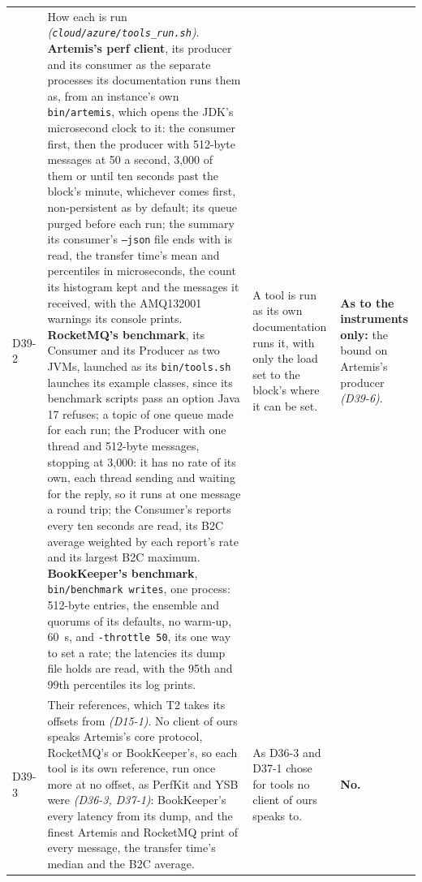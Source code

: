 \documentclass[11pt]{article}
\newcommand{\gl}[1]{{\color{soft}\itshape\small (#1)}}
\begin{document}
{\begin{longtable}{@{}p{1.1cm} >{\raggedright\arraybackslash}p{6.1cm} >{\raggedright\arraybackslash}p{6.0cm} >{\raggedright\arraybackslash}p{2.2cm}@{}}
D39-2 & How each is run \gl{\texttt{cloud/azure/tools\_run.sh}}. \textbf{Artemis's perf client}, its producer and its consumer as the separate processes its documentation runs them as, from an instance's own \texttt{bin/artemis}, which opens the JDK's microsecond clock to it: the consumer first, then the producer with 512-byte messages at 50 a second, 3,000 of them or until ten seconds past the block's minute, whichever comes first, non-persistent as by default; its queue purged before each run; the summary its consumer's \texttt{--json} file ends with is read, the transfer time's mean and percentiles in microseconds, the count its histogram kept and the messages it received, with the AMQ132001 warnings its console prints. \textbf{RocketMQ's benchmark}, its Consumer and its Producer as two JVMs, launched as its \texttt{bin/tools.sh} launches its example classes, since its benchmark scripts pass an option Java 17 refuses; a topic of one queue made for each run; the Producer with one thread and 512-byte messages, stopping at 3,000: it has no rate of its own, each thread sending and waiting for the reply, so it runs at one message a round trip; the Consumer's reports every ten seconds are read, its B2C average weighted by each report's rate and its largest B2C maximum. \textbf{BookKeeper's benchmark}, \texttt{bin/benchmark writes}, one process: 512-byte entries, the ensemble and quorums of its defaults, no warm-up, 60~s, and \texttt{-throttle 50}, its one way to set a rate; the latencies its dump file holds are read, with the 95th and 99th percentiles its log prints. & A tool is run as its own documentation runs it, with only the load set to the block's where it can be set. & \textbf{As to the instruments only:} the bound on Artemis's producer \gl{D39-6}. \\
D39-3 & Their references, which T2 takes its offsets from \gl{D15-1}. No client of ours speaks Artemis's core protocol, RocketMQ's or BookKeeper's, so each tool is its own reference, run once more at no offset, as PerfKit and YSB were \gl{D36-3, D37-1}: BookKeeper's every latency from its dump, and the finest Artemis and RocketMQ print of every message, the transfer time's median and the B2C average. & As D36-3 and D37-1 chose for tools no client of ours speaks to. & \textbf{No.} \\

\end{longtable}}
\end{document}
